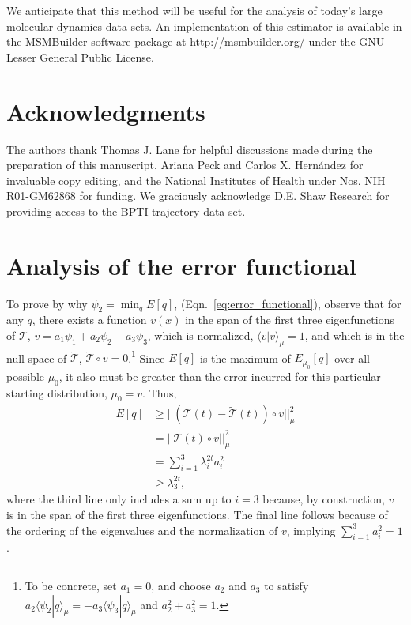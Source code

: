 \documentclass[aip, jcp, preprint, linenumbers, nofootinbib]{revtex4-1}
\begin{document}
We anticipate that this method will be useful for the analysis of today's large molecular dynamics data sets. An implementation of this estimator is available in the MSMBuilder software package at \url{http://msmbuilder.org/} under the GNU Lesser General Public License.

\section*{Acknowledgments}
The authors thank Thomas J. Lane for helpful discussions made during the preparation of this manuscript, Ariana Peck and Carlos X. Hern\'{a}ndez for invaluable copy editing, and the National Institutes of Health under Nos. NIH R01-GM62868 for funding. We graciously acknowledge D.E. Shaw Research for providing access to the BPTI trajectory data set.

\appendix
\section{Analysis of the error functional}
\label{appendix:error}

To prove by why $\psi_2 = \min_q E[q]$, (Eqn.~\ref{eq:error_functional}), observe that for any $q$, there exists a function $v(x)$ in the span of the first three eigenfunctions of $\mathcal{T}$, $v=a_1 \psi_1+ a_2 \psi_2 + a_3 \psi_3$, which is normalized, $\langle v | v \rangle_\mu = 1$, and which is in the null space of $\tilde{\mathcal{T}}$, $\tilde{\mathcal{T}} \circ v = 0$.\footnote{To be concrete, set $a_1 = 0$, and choose $a_2$ and $a_3$ to satisfy $a_2 \langle \psi_2 | q \rangle_\mu  = - a_3 \langle \psi_3 | q \rangle_\mu$ and $a_2^2 + a_3^2 = 1$.} Since $E[q]$ is the maximum of $E_{\mu_0}[q]$ over all possible $\mu_0$, it also must be greater than the error incurred for this particular starting distribution, $\mu_0=v$. Thus,
\begin{align}
E[q] &\geq || (\mathcal{T}(t) - \tilde{\mathcal{T}}(t)) \circ v ||_\mu^2 \\
&= || \mathcal{T}(t) \circ v ||_\mu^2 \\
&= \sum_{i=1}^3 \lambda_i^{2t} a_i^2 \\
&\geq \lambda_3^{2t},
\end{align}
where the third line only includes a sum up to $i=3$ because, by construction, $v$ is in the span of the first three eigenfunctions. The final line follows because of the ordering of the eigenvalues and the normalization of $v$, implying $\sum_{i=1}^3 a_i^2 = 1$.
\end{document}
